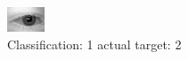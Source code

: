 \begin{figure}[h!]
\begin{center}
\includegraphics[width=0.60\columnwidth]{figures/ID341_class_1_target_2.png}
\end{center}
\caption{ Classification: 1 actual target: 2}
\label{fig:ID341_class_1_target_2}
\end{figure}
